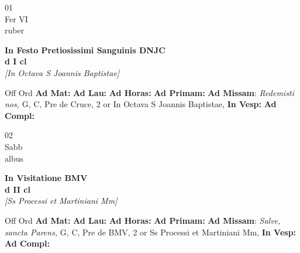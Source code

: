 \documentclass[10pt, openany]{book}
\begin{document}
    \begin{center}
        \begin{minipage}{3.5in}
            \vspace{2em}
            \begin{minipage}{0.5in}
                {\Huge 01} \\
                {\normalsize Fer VI} \\
                {\normalsize ruber}
            \end{minipage}
            \begin{minipage}{3.0in}
                \textbf{ \large In Festo Pretiosissimi Sanguinis DNJC \\
                \textnormal{\normalsize d I cl}} \\ \textit{[In Octava S Joannis Baptistae]} \\ 
            \end{minipage}
            \begin{justify}Off Ord
                \textbf{Ad Mat: }
                \textbf{Ad Lau: }
                \textbf{Ad Horas: }
                \textbf{Ad Primam: }\textbf{Ad Missam}: \textit{Redemisti nos,} G, C, Pre de Cruce, 2 or In Octava S Joannis Baptistae,  
                \textbf{In Vesp: }
                \textbf{Ad Compl: }
            \end{justify}
        \end{minipage}
    \end{center}

    \begin{center}
        \begin{minipage}{3.5in}
            \vspace{2em}
            \begin{minipage}{0.5in}
                {\Huge 02} \\
                {\normalsize Sabb} \\
                {\normalsize albus}
            \end{minipage}
            \begin{minipage}{3.0in}
                \textbf{ \large In Visitatione BMV \\
                \textnormal{\normalsize d II cl}} \\ \textit{[Ss Processi et Martiniani Mm]} \\ 
            \end{minipage}
            \begin{justify}Off Ord
                \textbf{Ad Mat: }
                \textbf{Ad Lau: }
                \textbf{Ad Horas: }
                \textbf{Ad Primam: }\textbf{Ad Missam}: \textit{Salve, sancta Parens,} G, C, Pre de BMV, 2 or Ss Processi et Martiniani Mm,  
                \textbf{In Vesp: }
                \textbf{Ad Compl: }
            \end{justify}
        \end{minipage}
    \end{center}
\end{document}
